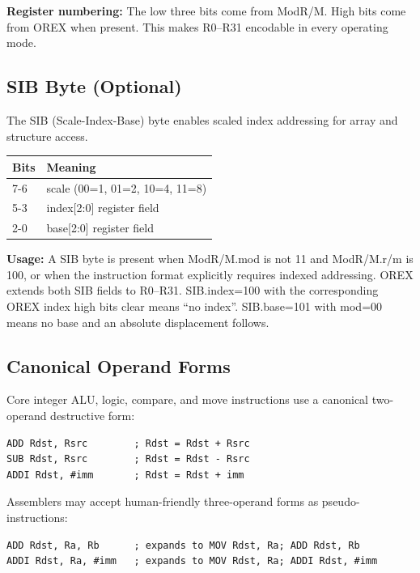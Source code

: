 \documentclass[11pt]{article}
\begin{document}
\textbf{Register numbering:} The low three bits come from ModR/M. High bits come from OREX when present. This makes R0--R31 encodable in every operating mode.

\subsection{SIB Byte (Optional)}

The SIB (Scale-Index-Base) byte enables scaled index addressing for array and structure access.

\begin{table}[h]
\centering
\begin{tabular}{@{}ll@{}}
\toprule
\textbf{Bits} & \textbf{Meaning} \\ \midrule
7-6 & scale (00=1, 01=2, 10=4, 11=8) \\
5-3 & index[2:0] register field \\
2-0 & base[2:0] register field \\ \bottomrule
\end{tabular}
\end{table}

\textbf{Usage:} A SIB byte is present when ModR/M.mod is not 11 and ModR/M.r/m is 100, or when the instruction format explicitly requires indexed addressing. OREX extends both SIB fields to R0--R31. SIB.index=100 with the corresponding OREX index high bits clear means ``no index''. SIB.base=101 with mod=00 means no base and an absolute displacement follows.

\subsection{Canonical Operand Forms}

Core integer ALU, logic, compare, and move instructions use a canonical two-operand destructive form:

\begin{lstlisting}
ADD Rdst, Rsrc        ; Rdst = Rdst + Rsrc
SUB Rdst, Rsrc        ; Rdst = Rdst - Rsrc
ADDI Rdst, #imm       ; Rdst = Rdst + imm
\end{lstlisting}

Assemblers may accept human-friendly three-operand forms as pseudo-instructions:

\begin{lstlisting}
ADD Rdst, Ra, Rb      ; expands to MOV Rdst, Ra; ADD Rdst, Rb
ADDI Rdst, Ra, #imm   ; expands to MOV Rdst, Ra; ADDI Rdst, #imm
\end{lstlisting}
\end{document}

